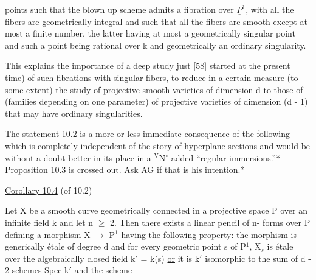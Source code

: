 
points such that the blown up scheme admits a fibration over $\underline{P}^1$,
with all the fibers are geometrically integral and such that all
the fibers are smooth except at most a finite number, the latter
having at most a geometrically singular point and such a point
being rational over k and geometrically an ordinary singularity.

This explains the importance of a deep study just [58]
started at the present time) of such fibrations with singular
fibers, to reduce in a certain measure (to some extent) the study
of projective smooth varieties of dimension d to those of
(families depending on one parameter) of projective varieties of
dimension (d - 1) that may have ordinary singularities.

The statement 10.2 is a more or less immediate consequence of
the following which is completely independent of the story of
hyperplane sections and would be without a doubt better in its
place in a ${}^{\mathrm{V}}$N$^{\circ}$ added ``regular immersions.''*
Proposition 10.3 is crossed out.  Ask AG if that is his
intention.*

\uline{Corollary 10.4} (of 10.2)

Let X be a smooth curve geometrically connected in a
projective space P over an infinite field k and let n $\geq$ 2.  Then
there exists a linear pencil of n- forms over P defining a
morphism X $\to$ P$^1$ having the following property:  the morphism is
generically étale of degree d and for every geometric point s of
P$^1$, X$_s$ is étale over the algebraically closed field k$'$ = k(s) \uline{or} it
is k$'$ isomorphic to the sum of d - 2 schemes Spec k$'$ and the scheme

